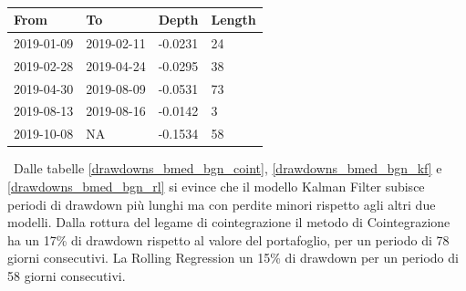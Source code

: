 \documentclass[]{article}
\begin{document}
\
\\
\begin{center}
	\begin{tabular}{@{}llll@{}}
		\toprule
	From       & To         & Depth   & Length \\ \midrule
	2019-01-09 & 2019-02-11 & -0.0231 & 24     \\
	2019-02-28 & 2019-04-24 & -0.0295 & 38     \\
	2019-04-30 & 2019-08-09 & -0.0531 & 73     \\
	2019-08-13 & 2019-08-16 & -0.0142 & 3      \\ 
	\rowcolor[HTML]{FFCCC9} 
	2019-10-08 & NA         & -0.1534 & 58    \\ \bottomrule
	\end{tabular}
	\label{drawdowns_bmed_bgn_rl}
\end{center}
\
Dalle tabelle \ref{drawdowns_bmed_bgn_coint}, \ref{drawdowns_bmed_bgn_kf} e \ref{drawdowns_bmed_bgn_rl} si evince che il modello Kalman Filter subisce periodi di drawdown più lunghi ma con perdite minori rispetto agli altri due modelli.
Dalla rottura del legame di cointegrazione il metodo di Cointegrazione ha un 17\% di drawdown rispetto al valore del portafoglio, per un periodo di 78 giorni consecutivi.
La Rolling Regression un 15\% di drawdown per un periodo di 58 giorni consecutivi.
\end{document}
